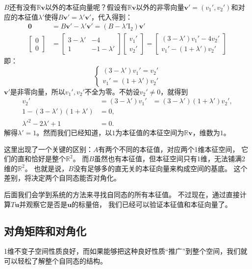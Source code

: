\documentclass[12pt,UTF8,fontset=none]{ctexbook}
\begin{document}
$B$还有没有$\mathbb{R}\mathbf{v}$以外的本征向量呢？假设有$\mathbb{R}\mathbf{v}$以外的非零向量$\mathbf{v}'=(v_1', v_2')$和对应的本征值$\lambda'$使得$B \mathbf{v}' = \lambda' \mathbf{v}'$，代入得到：
\begin{align*}
    \mathbf{0} &= B\mathbf{v}' - \lambda'\mathbf{v}' = (B - \lambda' \mathrm{I}_2)\mathbf{v}' \\
    \begin{bmatrix} 0 \\ 0 \end{bmatrix} &=  \begin{bmatrix} 3 - \lambda' & -4 \\ 1 & -1 - \lambda' \end{bmatrix} \begin{bmatrix}
       v_1'\\ v_2'
    \end{bmatrix} =  \begin{bmatrix}
       (3 - \lambda')v_1' - 4v_2' \\ v_1' - (1+\lambda')v_2'
    \end{bmatrix}
\end{align*}
即：
$$
\left\{
    \begin{aligned}
        (3 - \lambda')v_1' = v_2' \\
        v_1'= (1+\lambda')v_2' 
    \end{aligned}
\right.
$$
$\mathbf{v}'$是非零向量，所以$v_1', v_2'$不全为零。不妨设$v_2'\neq 0$，就得到
\begin{align*}
    v_2' &= (3 - \lambda')v_1' &= (3 - \lambda')(1+\lambda')v_2', \\
    1 - (3 - \lambda')(1+\lambda') &= 0, \\
    \lambda'^2 - 2\lambda' + 1 &= 0.
\end{align*}
解得$\lambda' = 1$。然而我们已经知道，以$1$为本征值的本征空间为$\mathbb{R}\mathbf{v}$，维数为$1$。

这里出现了一个关键的区别：$A$有两个不同的本征值，对应两个1维本征空间，
它们的直和恰好是整个$\mathbb{R}^2$。
而$B$虽然也有本征值，但本征空间只有1维，无法铺满2维的$\mathbb{R}^2$。
也就是说，$B$没有足够多的直无关的本征向量来构成空间的基底。
这个差别，将决定两个自同态能否对角化。

后面我们会学到系统的方法来寻找自同态的所有本征值。
不过现在，通过直接计算$T\mathbf{u}$并观察它是否是$\mathbf{u}$的标量倍，
我们已经可以验证本征值和本征向量了。

\subsection{对角矩阵和对角化}
1维不变子空间性质良好，而如果能够把这种良好性质“推广”到整个空间，我们就可以轻松了解整个自同态的结构。
\end{document}
